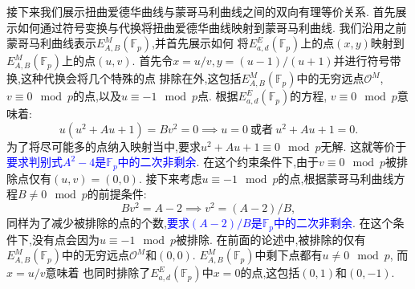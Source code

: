 \documentclass{article}
\newcommand{\F}{\mathbb{F}}
\newcommand{\blue}{\textcolor{blue}}
\begin{document}
接下来我们展示扭曲爱德华曲线与蒙哥马利曲线之间的双向有理等价关系.
首先展示如何通过符号变换与代换将扭曲爱德华曲线映射到蒙哥马利曲线.
我们沿用之前蒙哥马利曲线表示$E_{A,B}^M(\F_p)$,并首先展示如何
将$E_{a,d}^E(\F_p)$上的点$(x,y)$映射到$E_{A,B}^M(\F_p)$上的点$(u,v)$.
首先令$x = u/v, y = (u-1)/(u+1)$并进行符号带换,这种代换会将几个特殊的点
排除在外,这包括$E_{A,B}^M(\F_p)$中的无穷远点$\mathcal{O}^M$,
$v\equiv 0 \mod p$的点,以及$u\equiv -1 \mod p$点.
根据$E_{a,d}^E(\F_p)$的方程, $v\equiv 0 \mod p$意味着:
$$u(u^2 + Au + 1) = Bv^2 = 0 \implies u = 0\ \text{或者}\ u^2 + Au + 1 = 0. $$
为了将尽可能多的点纳入映射当中,要求$u^2 + Au + 1 \equiv 0 \mod p$无解.
这就等价于\blue{要求判别式$A^2-4$是$\F_p$中的二次非剩余}.
在这个约束条件下,由于$v\equiv 0 \mod p$被排除点仅有$(u,v) = (0,0)$.
接下来考虑$u\equiv -1 \mod p$的点,根据蒙哥马利曲线方程$B\neq 0\mod p$的前提条件:
$$Bv^2 = A - 2 \implies v^2 = (A -2)/B,$$
同样为了减少被排除的点的个数,\blue{要求$(A -2)/B$是$\F_p$中的二次非剩余}.
在这个条件下,没有点会因为$u\equiv -1 \mod p$被排除.
在前面的论述中,被排除的仅有$E_{A,B}^M(\F_p)$中的无穷远点$\mathcal{O}^M$和$(0,0)$.
$E_{A,B}^M(\F_p)$中剩下点都有$u\neq 0 \mod p$, 而$x = u/v$意味着
也同时排除了$E_{a,d}^E(\F_p)$中$x = 0$的点,这包括$(0,1)$和$(0,-1)$.
\end{document}
